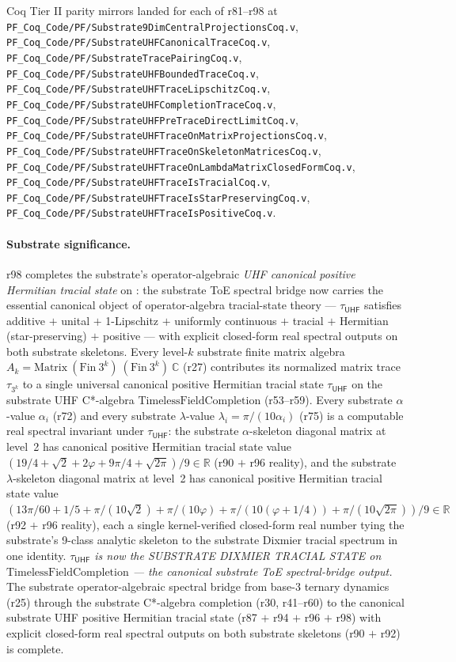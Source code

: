 \documentclass[11pt,a4paper]{amsart}
\theoremstyle{plain}
\theoremstyle{definition}
\begin{document}
Coq Tier II parity mirrors landed for each of r81--r98 at \texttt{PF\_Coq\_Code/PF/Substrate9DimCentralProjectionsCoq.v}, \texttt{PF\_Coq\_Code/PF/SubstrateUHFCanonicalTraceCoq.v}, \texttt{PF\_Coq\_Code/PF/SubstrateTracePairingCoq.v}, \texttt{PF\_Coq\_Code/PF/SubstrateUHFBoundedTraceCoq.v}, \texttt{PF\_Coq\_Code/PF/SubstrateUHFTraceLipschitzCoq.v}, \texttt{PF\_Coq\_Code/PF/SubstrateUHFCompletionTraceCoq.v}, \texttt{PF\_Coq\_Code/PF/SubstrateUHFPreTraceDirectLimitCoq.v}, \texttt{PF\_Coq\_Code/PF/SubstrateUHFTraceOnMatrixProjectionsCoq.v}, \texttt{PF\_Coq\_Code/PF/SubstrateUHFTraceOnSkeletonMatricesCoq.v}, \texttt{PF\_Coq\_Code/PF/SubstrateUHFTraceOnLambdaMatrixClosedFormCoq.v}, \texttt{PF\_Coq\_Code/PF/SubstrateUHFTraceIsTracialCoq.v}, \texttt{PF\_Coq\_Code/PF/SubstrateUHFTraceIsStarPreservingCoq.v}, \texttt{PF\_Coq\_Code/PF/SubstrateUHFTraceIsPositiveCoq.v}.

\paragraph{Substrate significance.} r98 completes the substrate's operator-algebraic \emph{UHF canonical positive Hermitian tracial state} on : the substrate ToE spectral bridge now carries the essential canonical object of operator-algebra tracial-state theory --- $\tau_{\textsf{UHF}}$ satisfies additive $+$ unital $+$ 1-Lipschitz $+$ uniformly continuous $+$ tracial $+$ Hermitian (star-preserving) $+$ positive --- with explicit closed-form real spectral outputs on both substrate skeletons. Every level-$k$ substrate finite matrix algebra $A_k = \mathrm{Matrix}~(\mathrm{Fin}~3^k)~(\mathrm{Fin}~3^k)~\mathbb{C}$ (r27) contributes its normalized matrix trace $\tau_{3^k}$ to a single universal canonical positive Hermitian tracial state $\tau_{\textsf{UHF}}$ on the substrate UHF C*-algebra $\text{TimelessFieldCompletion}$ (r53--r59). Every substrate $\alpha$-value $\alpha_i$ (r72) and every substrate $\lambda$-value $\lambda_i = \pi/(10 \alpha_i)$ (r75) is a computable real spectral invariant under $\tau_{\textsf{UHF}}$: the substrate $\alpha$-skeleton diagonal matrix at level~2 has canonical positive Hermitian tracial state value $(19/4 + \sqrt{2} + 2\varphi + 9\pi/4 + \sqrt{2\pi})/9 \in \mathbb{R}$ (r90 $+$ r96 reality), and the substrate $\lambda$-skeleton diagonal matrix at level~2 has canonical positive Hermitian tracial state value $(13\pi/60 + 1/5 + \pi/(10\sqrt{2}) + \pi/(10\varphi) + \pi/(10(\varphi + 1/4)) + \pi/(10\sqrt{2\pi}))/9 \in \mathbb{R}$ (r92 $+$ r96 reality), each a single kernel-verified closed-form real number tying the substrate's 9-class analytic skeleton to the substrate Dixmier tracial spectrum in one identity. \emph{$\tau_{\textsf{UHF}}$ is now the SUBSTRATE DIXMIER TRACIAL STATE on $\text{TimelessFieldCompletion}$ --- the canonical substrate ToE spectral-bridge output.} The substrate operator-algebraic spectral bridge from base-3 ternary dynamics (r25) through the substrate C*-algebra completion (r30, r41--r60) to the canonical substrate UHF positive Hermitian tracial state (r87 $+$ r94 $+$ r96 $+$ r98) with explicit closed-form real spectral outputs on both substrate skeletons (r90 $+$ r92) is complete.
\end{document}
